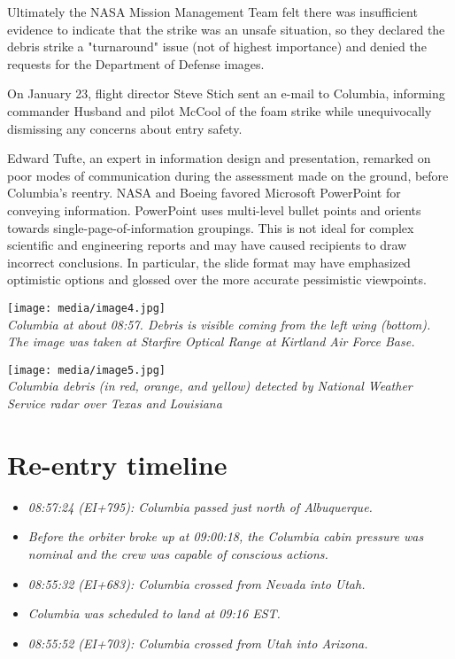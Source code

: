 Ultimately the NASA Mission Management Team felt there was insufficient
evidence to indicate that the strike was an unsafe situation, so they
declared the debris strike a "turnaround" issue (not of highest
importance) and denied the requests for the Department of Defense
images.

On January 23, flight director Steve Stich sent an e-mail to Columbia,
informing commander Husband and pilot McCool of the foam strike while
unequivocally dismissing any concerns about entry safety.

Edward Tufte, an expert in information design and presentation, remarked
on poor modes of communication during the assessment made on the ground,
before Columbia's reentry. NASA and Boeing favored Microsoft PowerPoint
for conveying information. PowerPoint uses multi-level bullet points and
orients towards single-page-of-information groupings. This is not ideal
for complex scientific and engineering reports and may have caused
recipients to draw incorrect conclusions. In particular, the slide
format may have emphasized optimistic options and glossed over the more
accurate pessimistic viewpoints.

\texttt{[image: media/image4.jpg]}\\
\emph{Columbia at about 08:57. Debris is visible coming from the left
wing (bottom). The image was taken at Starfire Optical Range at Kirtland
Air Force Base.}

\texttt{[image: media/image5.jpg]}\\
\emph{Columbia debris (in red, orange, and yellow) detected by National
Weather Service radar over Texas and Louisiana}

\section{Re-entry timeline}\label{re-entry-timeline}

\begin{itemize}
\item
  \emph{08:57:24 (EI+795): Columbia passed just north of Albuquerque.}
\item
  \emph{Before the orbiter broke up at 09:00:18, the Columbia cabin
  pressure was nominal and the crew was capable of conscious actions.}
\item
  \emph{08:55:32 (EI+683): Columbia crossed from Nevada into Utah.}
\item
  \emph{Columbia was scheduled to land at 09:16 EST.}
\item
  \emph{08:55:52 (EI+703): Columbia crossed from Utah into Arizona.}
\end{itemize}

